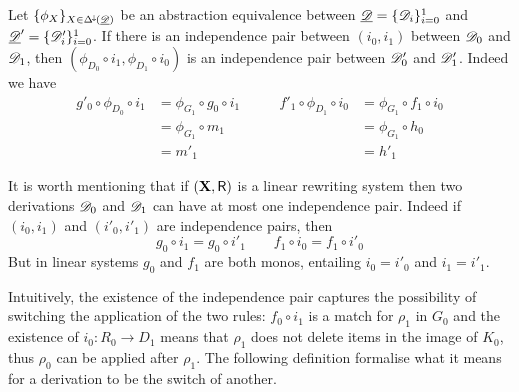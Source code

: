 \begin{remark}\label{rem:seqabs}
Let $\{\phi_X\}_{X\in \Delta^{\hspace{-1pt}\downarrow\hspace{-1pt}}(\underline{\mathscr{D}})}$ be an abstraction equivalence between $\underline{\mathscr{D}}=\{\mathscr{D}_i\}_{i=0}^1$ and $\underline{\mathscr{D}}'=\{\mathscr{D}'_i\}_{i=0}^1$. If there is an independence pair between $(i_0, i_1)$ between $\mathscr{D}_0$ and $\mathscr{D}_1$, then $(\phi_{D_0}\circ i_1, \phi_{D_1}\circ i_0)$ is an independence pair between $\mathscr{D}'_0$ and $\mathscr{D}'_1$. Indeed we have
\[\begin{split}
g'_0\circ \phi_{D_0}\circ i_1&=\phi_{G_1}\circ g_0\circ i_1\\&=\phi_{G_1}\circ m_1\\&= m'_1
\end{split}\qquad \begin{split}
f'_1\circ \phi_{D_1}\circ i_0&=\phi_{G_1}\circ f_1\circ i_0\\&=\phi_{G_1}\circ h_0\\&= h'_1
\end{split}\]
\end{remark}

\begin{remark}\label{rem:uni}
	It is worth mentioning that if $(\textbf {\textup{X}}, \mathsf{R})$ is a linear rewriting system then two derivations $\mathscr{D}_0$ and $\mathscr{D}_1$ can have at most one independence pair. Indeed if $(i_0,i_1)$ and $(i'_0, i'_1)$ are independence pairs, then
	\[g_0\circ i_1 = g_0\circ i'_1 \qquad f_1\circ i_0=f_1\circ i'_0\]
	But in linear systems $g_0$ and $f_1$ are both monos, entailing $i_0=i'_0$ and $i_1=i'_1$.
\end{remark}

Intuitively, the existence of the independence pair
captures the possibility of switching the application of the two rules:
$f_0 \circ i_1$ is a match for $\rho_1$ in $G_0$ and the
existence of $i_0 : R_0 \to D_1$ means that $\rho_1$ does not delete
items in the image of $K_0$, thus $\rho_0$ can be applied after
$\rho_1$. The following definition formalise what it means for a derivation to be the switch of another.

